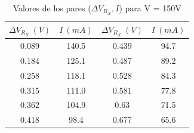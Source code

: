 \documentclass[12pt,a4paper]{article}
\begin{document}
\begin{table}[h!] 	 \centering 
\begin{tabular}{|c|c||c|c|} 
\hline 
$\Delta V_{R_X} \ (V)$ & $I \ (mA) $ & $\Delta V_{R_X} \ (V)$ & $I \ (mA) $  \\ \hline 
0.089 &  140.5 & 0.439 & 94.7 \\ 
0.184 &  125.1 & 0.487 & 89.2 \\ 
0.258 &  118.1 & 0.528 & 84.3 \\ 
0.315 &  111.0 & 0.581 & 77.8 \\ 
0.362 &  104.9 & 0.63 & 71.5 \\ 
0.418 &  98.4 & 0.677 & 65.6 \\ 
\hline 
\end{tabular} 
\caption{Valores de los pares ($\Delta V_{R_X},I$) para V = 150V} 
\label{tab:} 
\end{table} 


\newpage
\end{document}
